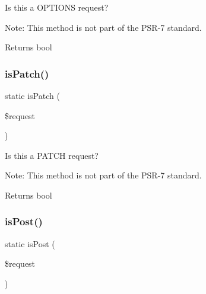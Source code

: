 Is this a O\+P\+T\+I\+O\+NS request?

Note\+: This method is not part of the P\+S\+R-\/7 standard.

\begin{DoxyReturn}{Returns}
bool 
\end{DoxyReturn}
\mbox{\label{class_pes_1_1_http_1_1_helper_1_1_request_status_a9e9a1c733f2f2b9076dfb86e50ce45e8}} 
\subsubsection{\texorpdfstring{is\+Patch()}{isPatch()}}
{\footnotesize\ttfamily static is\+Patch (\begin{DoxyParamCaption}\item[{Server\+Request\+Interface}]{\$request }\end{DoxyParamCaption})\hspace{0.3cm}{\ttfamily [static]}}

Is this a P\+A\+T\+CH request?

Note\+: This method is not part of the P\+S\+R-\/7 standard.

\begin{DoxyReturn}{Returns}
bool 
\end{DoxyReturn}
\mbox{\label{class_pes_1_1_http_1_1_helper_1_1_request_status_acaa75b6fcde6b8045c328ae876d61fa8}} 
\subsubsection{\texorpdfstring{is\+Post()}{isPost()}}
{\footnotesize\ttfamily static is\+Post (\begin{DoxyParamCaption}\item[{Server\+Request\+Interface}]{\$request }\end{DoxyParamCaption})\hspace{0.3cm}{\ttfamily [static]}}

